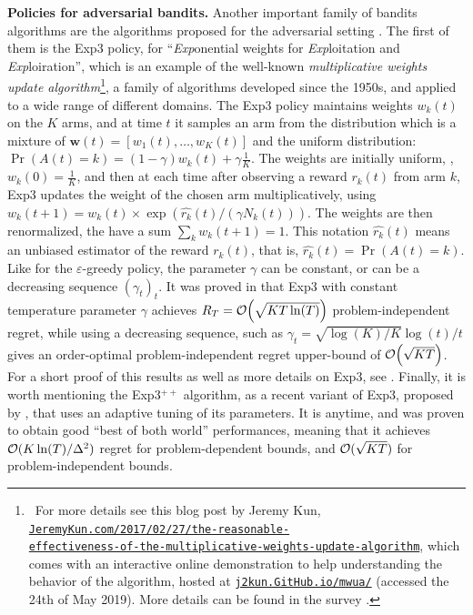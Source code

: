 \textbf{Policies for adversarial bandits.}
%
Another important family of bandits algorithms are the algorithms proposed for the adversarial setting \cite{Auer02NonStochastic}.
The first of them is the Exp3 policy, for ``\emph{Exp}onential weights for \emph{Exp}loitation and \emph{Exp}loiration'',
which is an example of the well-known \emph{multiplicative weights update algorithm}\footnote{~For more details see
this blog post by Jeremy Kun, \href{https://jeremykun.com/2017/02/27/the-reasonable-effectiveness-of-the-multiplicative-weights-update-algorithm/}{\texttt{JeremyKun.com/2017/02/27/the-reasonable-}}\\
\href{https://jeremykun.com/2017/02/27/the-reasonable-effectiveness-of-the-multiplicative-weights-update-algorithm/}{\texttt{effectiveness-of-the-multiplicative-weights-update-algorithm}},
which comes with an interactive online demonstration to help understanding the behavior of the algorithm, hosted at \href{https://j2kun.github.io/mwua/index.html}{\texttt{j2kun.GitHub.io/mwua/}} (accessed the 24th of May 2019). More details can be found in the survey \cite{Arora2012multiplicative}.},
a family of algorithms developed since the 1950s, and applied to a wide range of different domains.
%
The Exp3 policy maintains weights $w_k(t)$ on the $K$ arms, and at time $t$ it samples an arm from the distribution which is a mixture of $\bm{w}(t)=[w_1(t),\dots,w_K(t)]$ and the uniform distribution:
$\Pr(A(t)=k) = (1-\gamma) w_k(t) + \gamma \frac{1}{K}$.
The weights are initially uniform, \ie, $w_k(0)=\frac{1}{K}$, and then at each time after observing a reward $r_k(t)$ from arm $k$, Exp3 updates the weight of the chosen arm multiplicatively, using $w_k(t+1) = w_k(t) \times \exp(\widehat{r_k}(t) / (\gamma N_k(t)))$. The weights are then renormalized, the have a sum $\sum_k w_k(t+1) = 1$.
This notation $\widehat{r_k}(t)$ means an unbiased estimator of the reward $r_k(t)$, that is, $\widehat{r_k}(t) = \Pr(A(t)=k)$.
%
Like for the $\varepsilon$-greedy policy, the parameter $\gamma$ can be constant, or can be a decreasing sequence $(\gamma_t)_t$.
%
It was proved in \cite{Auer02NonStochastic} that Exp3 with constant temperature parameter $\gamma$ achieves $R_T = \mathop{}\mathopen{}\mathcal{O}\mathopen{}\left(\sqrt{K T \ln(T)}\right)$ problem-independent regret,
while using a decreasing sequence, such as $\gamma_t = \sqrt{\log(K) / K} \log(t) / t$ gives an order-optimal problem-independent regret upper-bound of $\mathop{}\mathopen{}\mathcal{O}\mathopen{}\left(\sqrt{K T}\right)$.
For a short proof of this results as well as more details on Exp3, see \cite{Bubeck12}.
%
Finally, it is worth mentioning the Exp3$^{++}$ algorithm, as a recent variant of Exp3, proposed by \cite{Seldin17},
that uses an adaptive tuning of its parameters.
It is anytime, and was proven to obtain good ``best of both world'' performances, meaning that it achieves $\mathcal{O}(K\ln(T)/\Delta^2)$ regret for problem-dependent bounds, and $\mathcal{O}(\sqrt{KT})$ for problem-independent bounds.




